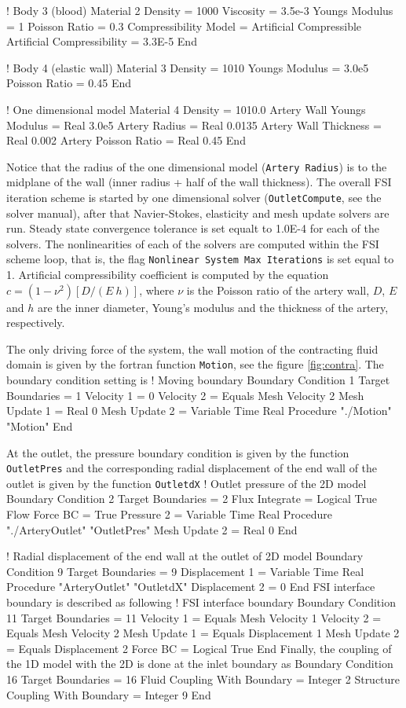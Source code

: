 ! Body 3 (blood)
Material 2
  Density = 1000
  Viscosity = 3.5e-3
  Youngs Modulus = 1
  Poisson Ratio = 0.3
  Compressibility Model = Artificial Compressible
  Artificial Compressibility  = 3.3E-5 
End

! Body 4 (elastic wall)
Material 3
  Density = 1010
  Youngs Modulus = 3.0e5
  Poisson Ratio = 0.45
End

! One dimensional model
Material 4
   Density = 1010.0
   Artery Wall Youngs Modulus = Real 3.0e5 
   Artery Radius = Real 0.0135 
   Artery Wall Thickness = Real 0.002
   Artery Poisson Ratio  = Real 0.45
End
\ttend

Notice that the radius of the one dimensional model ({\tt Artery Radius})
is to the midplane of the wall (inner radius + half of the wall thickness).
The overall FSI iteration scheme is started by one dimensional solver
({\tt OutletCompute}, see the solver manual), after that Navier-Stokes, 
elasticity and mesh update solvers are run.  Steady state convergence tolerance
is set equalt to 1.0E-4 for each of the solvers.  The nonlinearities
of each of the solvers are computed within the FSI scheme loop, that is,
the flag {\tt Nonlinear System Max Iterations} is set equal to 1.
Artificial compressibility coefficient is computed by the equation
$c = (1-\nu^2) [D/(E~h)]$, where $\nu$ is the Poisson ratio of the
artery wall, $D$, $E$ and $h$ are the inner diameter, Young's modulus
and the thickness of the artery, respectively.

The only driving force of the system, the wall motion of the contracting 
fluid domain is given by the fortran function {\tt Motion}, see the
figure \ref{fig:contra}.  The boundary condition setting is
\ttbegin
! Moving boundary
Boundary Condition 1
  Target Boundaries = 1
  Velocity 1 = 0
  Velocity 2 = Equals Mesh Velocity 2
  Mesh Update 1 = Real 0
  Mesh Update 2 = Variable Time
       Real Procedure "./Motion" "Motion"
End
\ttend

At the outlet, the pressure boundary condition is given by the
function {\tt OutletPres} and the corresponding radial displacement
of the end wall of the outlet is given by the function {\tt OutletdX}
\ttbegin
! Outlet pressure of the 2D model
Boundary Condition 2
  Target Boundaries = 2
  Flux Integrate = Logical True
  Flow Force BC = True
  Pressure 2 = Variable Time
      Real Procedure "./ArteryOutlet" "OutletPres"
  Mesh Update 2 = Real 0
End

! Radial displacement of the end wall at the outlet of 2D model
Boundary Condition 9
  Target Boundaries = 9
  Displacement 1 = Variable Time
      Real Procedure "ArteryOutlet" "OutletdX"
  Displacement 2 = 0 
End
\ttend
FSI interface boundary is described as following
\ttbegin
! FSI interface boundary
Boundary Condition 11
  Target Boundaries = 11
  Velocity 1 = Equals Mesh Velocity 1
  Velocity 2 = Equals Mesh Velocity 2
  Mesh Update 1 = Equals Displacement 1
  Mesh Update 2 = Equals Displacement 2
  Force BC = Logical True
End
\ttend
Finally, the coupling of the 1D model with the 2D is 
done at the inlet boundary as
\ttbegin
Boundary Condition 16
  Target Boundaries = 16
  Fluid Coupling With Boundary = Integer 2
  Structure Coupling With Boundary = Integer 9
End
\ttend


